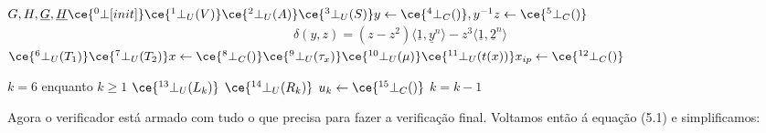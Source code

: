\newpage
$
G, H, \underline{G}, \underline{H} \hspace*{\fill} \ce{^{0}_{\ }\bot[init]} \newline
\hspace*{\fill} \ce{^{1}_{\ }\bot_U(V)} \newline
\hspace*{\fill} \ce{^{2}_{\ }\bot_U(A)} \newline
\hspace*{\fill} \ce{^{3}_{\ }\bot_U(S)} \newline
y\leftarrow \ce{^{4}_{\ }\bot_C()}, y^{-1} \newline
z\leftarrow \ce{^{5}_{\ }\bot_C()} \newline
$
\begin{align*}
\delta(y,z) = (z - z^2)  \langle \underline{1}, \underline{y}^n \rangle - z^3 \langle \underline{1}, \underline{2}^n \rangle
\end{align*}
$
\hspace*{\fill} \ce{^{6}_{\ }\bot_U(T_1)} \newline
\hspace*{\fill} \ce{^{7}_{\ }\bot_U(T_2)} \newline
x\leftarrow \ce{^{8}_{\ }\bot_C()} \newline
\hspace*{\fill}\ce{^{9}_{\ }\bot_U(\tau_x)} \newline
\hspace*{\fill}\ce{^{10}_{\ }\bot_U(\mu)} \newline
\hspace*{\fill}\ce{^{11}_{\ }\bot_U(t(x))} \newline
x_{ip}\leftarrow \ce{^{12}_{\ }\bot_C()} \newline
$

$k=6$\newline
enquanto $k \geq 1$\newline
$\hspace*{\fill}\ce{^{13}_{\ }\bot_U(L_k)}$ \newline
$\hspace*{\fill}\ce{^{14}_{\ }\bot_U(R_k)}$ \newline
$u_k\leftarrow \ce{^{15}_{\ }\bot_C()}$ \newline
$k=k-1$

Agora o verificador está armado com tudo o que precisa para fazer a verificação final. Voltamos então á equação (5.1) e simplificamos:\newline

